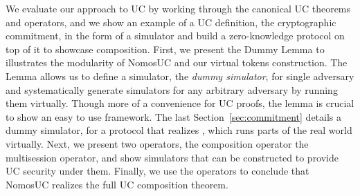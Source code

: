 We evaluate our approach to UC by working through the canonical UC theorems and operators, and we show an example of a UC definition,
the cryptographic commitment, in the form of a simulator and build a zero-knowledge protocol on top of it to showcase composition.
First, we present the Dummy Lemma to illustrates the modularity of NomosUC and our virtual tokens construction.
The Lemma allows us to define a simulator, the \emph{dummy simulator}, for single adversary and systematically generate simulators for any arbitrary adversary
by running them virtually. Though more of a convenience for UC proofs, the lemma is crucial to show an easy to use framework.
The last Section~\ref{sec:commitment} details a dummy simulator, for a protocol that realizes \Fcom, which runs parts of the real world virtually. 
Next, we present two operators, the composition operator the multisession operator, and show simulators that can be constructed to provide UC security under them.
Finally, we use the operators to conclude that NomosUC realizes the full UC composition theorem.

